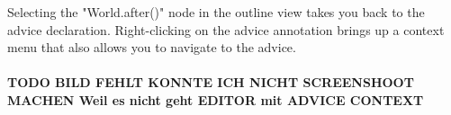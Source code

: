 Selecting the "World.after()" node in the outline view takes you back to the advice declaration. Right-clicking on the advice annotation brings up a context menu that also allows you to navigate to the advice.\\\\
\textbf{TODO BILD FEHLT KONNTE ICH NICHT SCREENSHOOT MACHEN  Weil es nicht geht EDITOR mit ADVICE CONTEXT}

